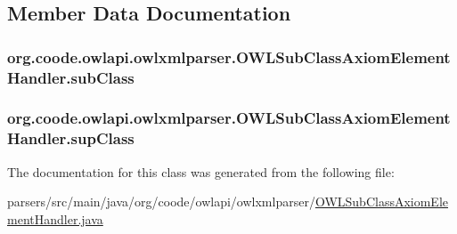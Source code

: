 \subsection{Member Data Documentation}
\hypertarget{classorg_1_1coode_1_1owlapi_1_1owlxmlparser_1_1_o_w_l_sub_class_axiom_element_handler_aab4f000d190be3413710292b938e8176}{
\subsubsection[{sub\-Class}]{ org.\-coode.\-owlapi.\-owlxmlparser.\-O\-W\-L\-Sub\-Class\-Axiom\-Element\-Handler.\-sub\-Class\hspace{0.3cm}{\ttfamily [private]}}}\label{classorg_1_1coode_1_1owlapi_1_1owlxmlparser_1_1_o_w_l_sub_class_axiom_element_handler_aab4f000d190be3413710292b938e8176}
\hypertarget{classorg_1_1coode_1_1owlapi_1_1owlxmlparser_1_1_o_w_l_sub_class_axiom_element_handler_a1b369d1df8d300cc84b39747764c1f51}{
\subsubsection[{sup\-Class}]{ org.\-coode.\-owlapi.\-owlxmlparser.\-O\-W\-L\-Sub\-Class\-Axiom\-Element\-Handler.\-sup\-Class\hspace{0.3cm}{\ttfamily [private]}}}\label{classorg_1_1coode_1_1owlapi_1_1owlxmlparser_1_1_o_w_l_sub_class_axiom_element_handler_a1b369d1df8d300cc84b39747764c1f51}


The documentation for this class was generated from the following file\-:\begin{DoxyCompactItemize}
\item 
parsers/src/main/java/org/coode/owlapi/owlxmlparser/\hyperlink{_o_w_l_sub_class_axiom_element_handler_8java}{O\-W\-L\-Sub\-Class\-Axiom\-Element\-Handler.\-java}\end{DoxyCompactItemize}
